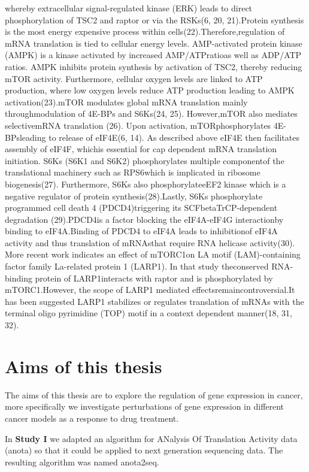 \documentclass[12pt,openany]{book}
\begin{document}
whereby extracellular signal-regulated kinase (ERK) leads to direct
phosphorylation of TSC2 and raptor or via the RSKs(6, 20, 21).Protein
synthesis is the most energy expensive process within
cells(22).Therefore,regulation of mRNA translation is tied to cellular
energy levels. AMP-activated protein kinase (AMPK) is a kinase activated
by increased AMP/ATPratioas well as ADP/ATP ratios. AMPK inhibits
protein synthesis by activation of TSC2, thereby reducing mTOR activity.
Furthermore, cellular oxygen levels are linked to ATP production, where
low oxygen levels reduce ATP production leading to AMPK
activation(23).mTOR modulates global mRNA translation mainly
throughmodulation of 4E-BPs and S6Ks(24, 25). However,mTOR also mediates
selectivemRNA translation (26). Upon activation, mTORphosphorylates
4E-BPsleading to release of eIF4E(6, 14). As described above eIF4E then
facilitates assembly of eIF4F, whichis essential for cap dependent mRNA
translation initiation. S6Ks (S6K1 and S6K2) phosphorylates multiple
componentof the translational machinery such as RPS6which is implicated
in ribosome biogenesis(27). Furthermore, S6Ks also phosphorylateeEF2
kinase which is a negative regulator of protein synthesis(28).Lastly,
S6Ks phosphorylate programmed cell death 4 (PDCD4)triggering its
SCFbetaTrCP-dependent degradation (29).PDCD4is a factor blocking the
eIF4A-eIF4G interactionby binding to eIF4A.Binding of PDCD4 to eIF4A
leads to inhibitionof eIF4A activity and thus translation of mRNAsthat
require RNA helicase activity(30). More recent work indicates an effect
of mTORC1on LA motif (LAM)-containing factor family La-related protein 1
(LARP1). In that study theconserved RNA-binding protein of
LARP1interacts with raptor and is phosphorylated by mTORC1.However, the
scope of LARP1 mediated effectsremaincontroversial.It has been suggested
LARP1 stabilizes or regulates translation of mRNAs with the terminal
oligo pyrimidine (TOP) motif in a context dependent manner(18, 31, 32).

\chapter{Aims of this thesis}

The aims of this thesis are to explore the regulation of gene expression
in cancer, more specifically we investigate perturbations of gene
expression in different cancer models as a response to drug treatment.

In \textbf{Study I} we adapted an algorithm for ANalysis Of Translation
Activity data (anota) so that it could be applied to next generation
sequencing data. The resulting algorithm was named anota2seq.
\end{document}
